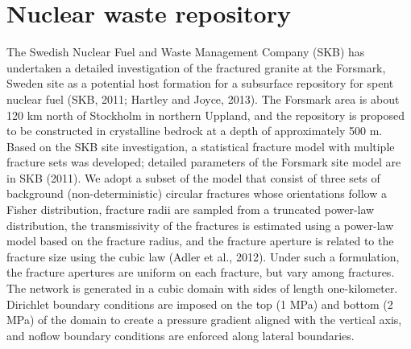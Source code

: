 \documentclass[letterpaper,10pt,english]{sphinxmanual}
\begin{document}
\section{Nuclear waste repository}
\label{applications:nuclear-waste-repository}
The Swedish Nuclear Fuel and Waste Management Company (SKB) has undertaken a detailed investigation of the fractured granite at the Forsmark, Sweden site as a potential host formation for a subsurface repository for spent nuclear fuel (SKB, 2011; Hartley and Joyce, 2013). The Forsmark area is about 120 km north of Stockholm in northern Uppland, and the repository is proposed
to be constructed in crystalline bedrock at a depth of approximately 500 m. Based on the SKB site investigation, a statistical fracture model with multiple fracture sets was developed; detailed parameters of the Forsmark site model are in SKB (2011). We adopt a subset of the model that consist of three sets of background (non-deterministic) circular fractures whose orientations follow a Fisher distribution, fracture radii are sampled from a truncated power-law distribution, the transmissivity of the fractures is estimated using a power-law model based on the fracture radius, and the fracture aperture is related to the fracture size using the cubic law (Adler et al., 2012). Under such a formulation, the fracture apertures are uniform on each fracture, but vary among fractures. The network is generated in a cubic domain with sides of length one-kilometer. Dirichlet boundary conditions are imposed on the top (1 MPa) and bottom (2 MPa) of the domain to create a pressure gradient aligned with the vertical axis, and noflow boundary conditions are enforced along lateral boundaries.
\end{document}
